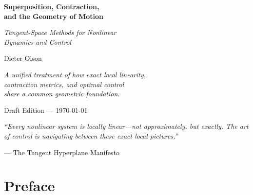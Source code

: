 \documentclass[11pt,letterpaper,openany]{book}
\theoremstyle{plain}
\theoremstyle{definition}
\theoremstyle{remark}
\begin{document}
\begin{titlepage}
\centering
\vspace*{2cm}

{\Huge\bfseries Superposition, Contraction,\\[6pt]
and the Geometry of Motion\par}

\vspace{1.5cm}

{\Large\itshape Tangent-Space Methods for Nonlinear\\[4pt]
Dynamics and Control\par}

\vspace{3cm}

{\Large Dieter Olson\par}

\vspace{2cm}

{\large\itshape
A unified treatment of how exact local linearity,\\[4pt]
contraction metrics, and optimal control\\[4pt]
share a common geometric foundation.\par}

\vfill

{\large Draft Edition --- \today\par}
\end{titlepage}

\frontmatter

\thispagestyle{empty}
\vspace*{\fill}
\begin{center}
\begin{minipage}{0.7\textwidth}
\centering
\itshape
``Every nonlinear system is locally linear---not approximately, but exactly.
The art of control is navigating between these exact local pictures.''

\vspace{0.5cm}
--- The Tangent Hyperplane Manifesto
\end{minipage}
\end{center}
\vspace*{\fill}
\newpage

\chapter{Preface}
\end{document}
